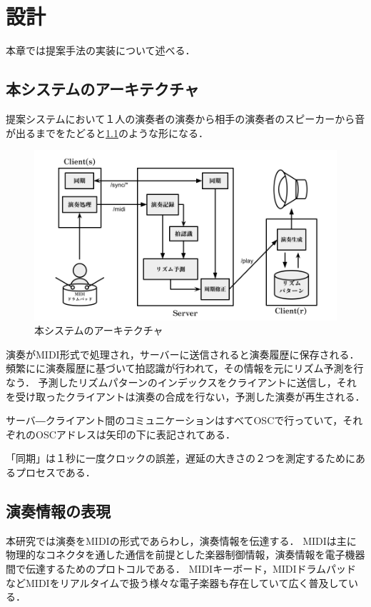 \chapter{設計}
\label{implementation}

本章では提案手法の実装について述べる．

\section{本システムのアーキテクチャ}
提案システムにおいて１人の演奏者の演奏から相手の演奏者のスピーカーから音が出るまでをたどると\ref{fig:architecture}のような形になる．

\begin{figure}[htbp]
  \centering
  \includegraphics[width=0.8\linewidth]{src/img/architecture.png}
  \caption{本システムのアーキテクチャ}
  \label{fig:architecture}
\end{figure}

演奏がMIDI形式で処理され，サーバーに送信されると演奏履歴に保存される．
頻繁にに演奏履歴に基づいて拍認識が行われて，その情報を元にリズム予測を行なう．
予測したリズムパターンのインデックスをクライアントに送信し，それを受け取ったクライアントは演奏の合成を行ない，予測した演奏が再生される．

サーバ―クライアント間のコミュニケーションはすべてOSCで行っていて，それぞれのOSCアドレスは矢印の下に表記されてある．

「同期」は１秒に一度クロックの誤差，遅延の大きさの２つを測定するためにあるプロセスである．

\section{演奏情報の表現}
本研究では演奏をMIDIの形式であらわし，演奏情報を伝達する．
MIDIは主に物理的なコネクタを通した通信を前提とした楽器制御情報，演奏情報を電子機器間で伝達するためのプロトコルである．\cite{midi}
MIDIキーボード，MIDIドラムパッドなどMIDIをリアルタイムで扱う様々な電子楽器も存在していて広く普及している．


